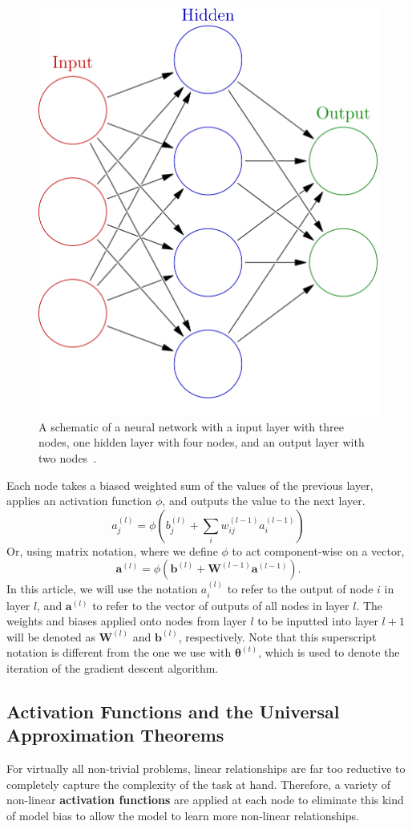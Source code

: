 \documentclass[12pt]{report}
\theoremstyle{definition}
\theoremstyle{remark}
\begin{document}
\begin{figure}[h]
    \centering
    \includegraphics[width=0.3\linewidth]{figs/colored_neural_network.png}
    \caption{A schematic of a neural network with a input layer with three nodes, one hidden layer with four nodes, and an output layer with two nodes~\cite{commons_filecolored_2025}.}
    \label{fig:enter-label}
\end{figure}

Each node takes a biased weighted sum of the values of the previous layer, applies an activation function $\phi$, and outputs the value to the next layer.
\begin{equation}
    a^{(l)}_j = \phi\left(b_j^{(l)} + \sum_i w_{ij}^{(l-1)} a_i^{(l-1)}\right)
\end{equation}
Or, using matrix notation, where we define $\phi$ to act component-wise on a vector,
\begin{equation}
    \mathbf{a}^{(l)} = \phi\left(\mathbf{b}^{(l)} + \mathbf{W}^{(l-1)}\mathbf{a}^{(l-1)}\right).
\end{equation}
In this article, we will use the notation $a^{(l)}_i$ to refer to the output of node $i$ in layer $l$, and $\mathbf{a}^{(l)}$ to refer to the vector of outputs of all nodes in layer $l$. The weights and biases applied onto nodes from layer $l$ to be inputted into layer $l+1$ will be denoted as $\mathbf{W}^{(l)}$ and $\mathbf{b}^{(l)}$, respectively. Note that this superscript notation is different from the one we use with $\boldsymbol{\theta}^{(t)}$, which is used to denote the iteration of the gradient descent algorithm.

\subsection{Activation Functions and the Universal Approximation Theorems}

For virtually all non-trivial problems, linear relationships are far too reductive to completely capture the complexity of the task at hand. Therefore, a variety of non-linear \textbf{activation functions} are applied at each node to eliminate this kind of model bias to allow the model to learn more non-linear relationships.
\end{document}
